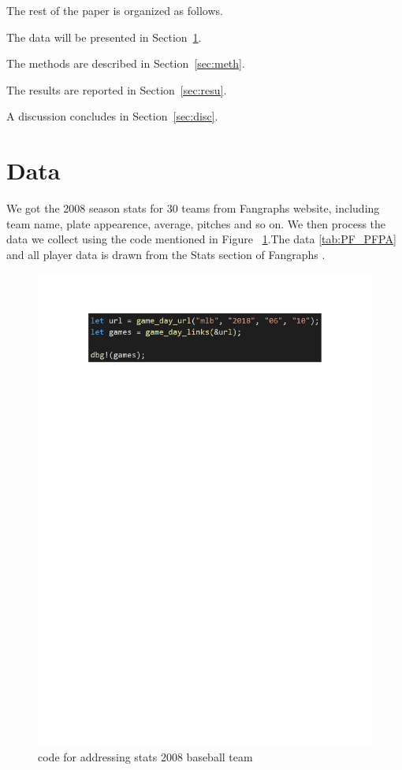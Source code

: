 \documentclass[12pt]{article}
\begin{document}
The rest of the paper is organized as follows.

The data will be presented in Section~\ref{sec:data}.

The methods are described in Section~\ref{sec:meth}.

The results are reported in Section~\ref{sec:resu}.

A discussion concludes in Section~\ref{sec:disc}.

\section{Data}
\label{sec:data}


We got the 2008 season stats for 30 teams from Fangraphs website, including team name, plate appearence, average, 
pitches and so on. We then process the data we collect using the code mentioned in Figure~ \ref*{fig:baseballcode}.The 
data \ref{tab:PF_PFPA} and all player data is drawn from the Stats section of Fangraphs \cite*{web:data}. 

\begin{figure}[tbp]
  \centering
  \includegraphics[width=\textwidth]{baseballcode.pdf}
  \caption{code for addressing stats 2008 baseball team}
  \label{fig:baseballcode}
\end{figure}
\end{document}
